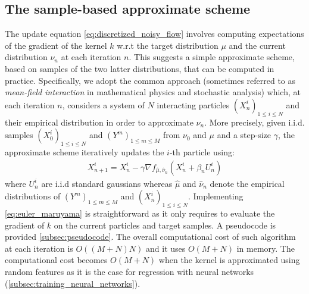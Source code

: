 
\subsection{The sample-based approximate scheme}\label{sec:sample_based}

The update equation \eqref{eq:discretized_noisy_flow} involves computing expectations of the gradient of the kernel $k$ w.r.t the target distribution $\mu$ and the current distribution $\nu_n$ at each iteration $n$. This suggests a simple approximate scheme, based on samples of the two latter distributions, that can be computed in practice. Specifically, we adopt the common approach (sometimes referred to as \textit{mean-field interaction} in mathematical physics and stochastic analysis) which, at each iteration $n$, considers a system of $N$ interacting particles $(X_n^i)_{1\leq i\leq N}$  and their empirical distribution in order to approximate $\nu_n$. 
More precisely, given i.i.d. samples $(X^i_0)_{1\leq i\leq N}$ and $(Y^{m})_{1\leq m\leq M}$ from $\nu_0$ and $\mu$ and a step-size $\gamma$, the approximate scheme iteratively updates the $i$-th particle using: 
\begin{align}\label{eq:euler_maruyama}
X_{n+1}^{i} = X_n^i -\gamma \nabla f_{\hat{\mu},\hat{\nu}_n}(X_n^i+\beta_n U_n^i)
\end{align}
where $U_{n}^{i}$ are i.i.d standard gaussians whereas $\hat{\mu}$ and $\hat{\nu}_n$ denote the empirical distributions of $(Y^{m})_{1\leq m\leq M}$ and $(X^i_n)_{1\leq i\leq N}$. %
Implementing \cref{eq:euler_maruyama} is straightforward as it only requires to evaluate the gradient of $k$ on the current particles and target samples. A pseudocode is provided \cref{subsec:pseudocode}. 
The overall computational cost of such algorithm at each iteration is $O((M+N)N)$ and it uses $O(M+N)$ in memory. The computational cost becomes  $O(M+N)$ when the kernel is approximated using random features as it is the case for regression with neural networks (\cref{subsec:training_neural_networks}). 
